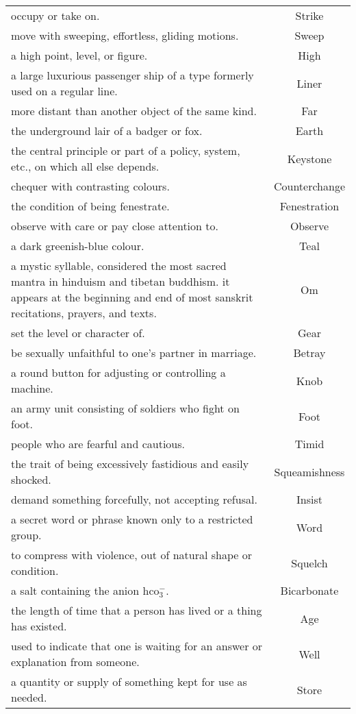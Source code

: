 \begin{longtable}{p{12cm}c}
occupy or take on. & Strike\\
move with sweeping, effortless, gliding motions. & Sweep\\
a high point, level, or figure. & High\\
a large luxurious passenger ship of a type formerly used on a regular line. & Liner\\
more distant than another object of the same kind. & Far\\
the underground lair of a badger or fox. & Earth\\
the central principle or part of a policy, system, etc., on which all else depends. & Keystone\\
chequer with contrasting colours. & Counterchange\\
the condition of being fenestrate. & Fenestration\\
observe with care or pay close attention to. & Observe\\
a dark greenish-blue colour. & Teal\\
a mystic syllable, considered the most sacred mantra in hinduism and tibetan buddhism. it appears at the beginning and end of most sanskrit recitations, prayers, and texts. & Om\\
set the level or character of. & Gear\\
be sexually unfaithful to one's partner in marriage. & Betray\\
a round button for adjusting or controlling a machine. & Knob\\
an army unit consisting of soldiers who fight on foot. & Foot\\
people who are fearful and cautious. & Timid\\
the trait of being excessively fastidious and easily shocked. & Squeamishness\\
demand something forcefully, not accepting refusal. & Insist\\
a secret word or phrase known only to a restricted group. & Word\\
to compress with violence, out of natural shape or condition. & Squelch\\
a salt containing the anion hco$_3^-$. & Bicarbonate\\
the length of time that a person has lived or a thing has existed. & Age\\
used to indicate that one is waiting for an answer or explanation from someone. & Well\\
a quantity or supply of something kept for use as needed. & Store\\

\end{longtable}
